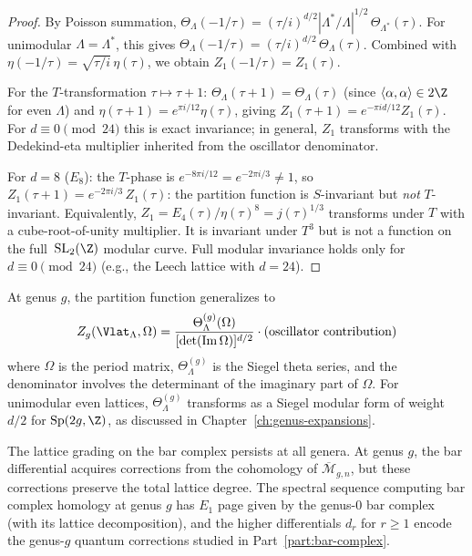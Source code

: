 \begin{proof}
By Poisson summation, $\Theta_\Lambda(-1/\tau) =
(\tau/i)^{d/2} |\Lambda^*/\Lambda|^{1/2}\, \Theta_{\Lambda^*}(\tau)$.
For unimodular $\Lambda = \Lambda^*$, this gives
$\Theta_\Lambda(-1/\tau) = (\tau/i)^{d/2}\, \Theta_\Lambda(\tau)$.
Combined with $\eta(-1/\tau) = \sqrt{\tau/i}\,\eta(\tau)$,
we obtain $Z_1(-1/\tau) = Z_1(\tau)$.

For the $T$-transformation $\tau \mapsto \tau + 1$:
$\Theta_\Lambda(\tau+1) = \Theta_\Lambda(\tau)$ (since
$\langle\alpha,\alpha\rangle \in 2\Z$ for even $\Lambda$) and
$\eta(\tau+1) = e^{\pi i/12}\eta(\tau)$, giving
$Z_1(\tau+1) = e^{-\pi i d/12} Z_1(\tau)$. For $d \equiv 0 \pmod{24}$
this is exact invariance; in general, $Z_1$ transforms with the
Dedekind-eta multiplier inherited from the oscillator denominator.

For $d = 8$ ($E_8$): the $T$-phase is $e^{-8\pi i/12} = e^{-2\pi i/3} \neq 1$, so
$Z_1(\tau+1) = e^{-2\pi i/3}\, Z_1(\tau)$: the partition function is $S$-invariant
but \emph{not} $T$-invariant. Equivalently,
$Z_1 = E_4(\tau)/\eta(\tau)^8 = j(\tau)^{1/3}$ transforms under $T$ with a
cube-root-of-unity multiplier. It is invariant under $T^3$ but is not a
function on the full~$\mathrm{SL}_2(\Z)$ modular curve.
Full modular invariance holds only for $d \equiv 0 \pmod{24}$
(e.g., the Leech lattice with $d = 24$).
\end{proof}

\begin{remark}
\label{rem:lattice:higher-genus}
At genus $g$, the partition function generalizes to
\[
Z_g(\Vlat_\Lambda, \Omega)
= \frac{\Theta_\Lambda^{(g)}(\Omega)}{[\det(\operatorname{Im}\Omega)]^{d/2}}
\cdot (\text{oscillator contribution})
\]
where $\Omega$ is the period matrix, $\Theta_\Lambda^{(g)}$ is the
Siegel theta series, and the denominator involves the determinant of the
imaginary part of $\Omega$. For unimodular even lattices,
$\Theta_\Lambda^{(g)}$ transforms as a Siegel modular form of weight
$d/2$ for $\operatorname{Sp}(2g, \Z)$, as discussed in
Chapter~\ref{ch:genus-expansions}.

The lattice grading on the bar complex
persists at all genera. At genus $g$, the bar differential acquires
corrections from the cohomology of $\overline{\mathcal{M}}_{g,n}$, but these
corrections preserve the total lattice degree. The spectral sequence
computing bar complex homology at genus $g$ has $E_1$ page given by
the genus-0 bar complex (with its lattice decomposition), and the
higher differentials $d_r$ for $r \geq 1$ encode the genus-$g$
quantum corrections studied in Part~\ref{part:bar-complex}.
\end{remark}

